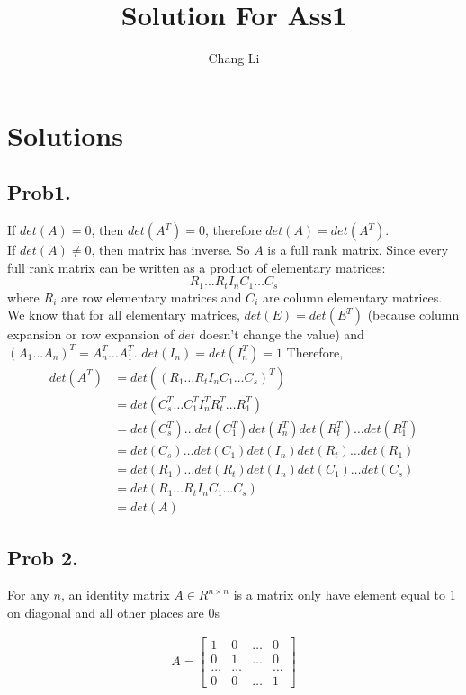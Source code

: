 \documentclass[10pt,a4paper]{article}
\begin{document}
\title{Solution For Ass1}
\author{Chang Li}
\maketitle

\section{Solutions}

\subsection{Prob1.}
If $det(A) = 0$, then $det(A^T) = 0$, therefore $det(A) = det(A^T)$.\\
If $det(A) \neq 0$, then matrix has inverse. So $A$ is a full rank matrix. Since every full rank matrix can be written as a product of elementary matrices:
$$
R_1\dots R_tI_nC_1\dots C_s
$$
where $R_i$ are row elementary matrices and $C_i$ are column elementary matrices. We know that for all elementary matrices, $det(E) = det(E^T)$ (because column expansion or row expansion of $det$ doesn't change the value) and $(A_1\dots A_n)^T = A_n^T\dots A_1^T$. $det(I_n) = det(I_n^T) = 1$ Therefore, 
\begin{align*}
	det(A^T) &= det((R_1\dots R_tI_nC_1\dots C_s)^T)\\
	&= det(C_s^T\dots C_1^T I_n^T R_t^T\dots R_1^T) \\
	&= det(C_s^T)\dots det(C_1^T) det(I_n^T) det(R_t^T)\dots det(R_1^T) \\
	&= det(C_s)\dots det(C_1) det(I_n) det(R_t)\dots det(R_1) \\
	&= det(R_1)\dots det(R_t) det(I_n) det(C_1) \dots det(C_s) \\
	&= det(R_1\dots R_tI_nC_1\dots C_s) \\
	&= det(A)
\end{align*}

\subsection{Prob 2.}
For any $n$, an identity matrix $A\in R^{n\times n}$ is a matrix only have element equal to 1 on diagonal and all other places are 0s

\begin{align*}
A = \left[ \begin{matrix}
1 & 0 & \dots & 0 \\
0 & 1 & \dots & 0 \\
\dots & \dots & &\dots\\
0 & 0 & \dots & 1
\end{matrix} \right]
\end{align*}
\end{document}
